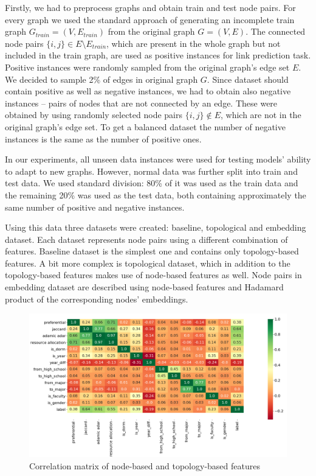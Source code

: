 \documentclass[9pt,twocolumn,twoside]{pnas-new}
\begin{document}
Firstly, we had to preprocess graphs and obtain train and test node pairs. For every graph we used the standard approach of generating an incomplete train graph $G_{train} = (V, E_ {train})$ from the original graph $G = (V, E)$. The connected node pairs $\{i, j\} \in E \setminus E_{train}$, which are present in the whole graph but not included in the train graph, are used as positive instances for link prediction task. Positive instances were randomly sampled from the original graph's edge set $E$. We decided to sample 2\% of edges in original graph $G$. Since dataset should contain positive as well as negative instances, we had to obtain also negative instances -- pairs of nodes that are not connected by an edge. These were obtained by using randomly selected node pairs $\{i, j\} \notin E$, which are not in the original graph's edge set. To get a balanced dataset the number of negative instances is the same as the number of positive ones.

In our experiments, all unseen data instances were used for testing models' ability to adapt to new graphs. However, normal data was further split into train and test data. We used standard division: 80\% of it was used as the train data and the remaining 20\% was used as the test data, both containing approximately the same number of positive and negative instances.

Using this data three datasets were created: baseline, topological and embedding dataset. Each dataset represents node pairs using a different combination of features. Baseline dataset is the simplest one and contains only topology-based features. A bit more complex is topological dataset, which in addition to the topology-based features makes use of node-based features as well. Node pairs in embedding dataset are described using node-based features and Hadamard product of the corresponding nodes' embeddings.





\begin{figure}
\centering
\includegraphics[width=16cm]{topological_correlation_matrix.png}
\caption{Correlation matrix of node-based and topology-based features}
\label{fig:correlation_matrix}
\end{figure}
\end{document}
